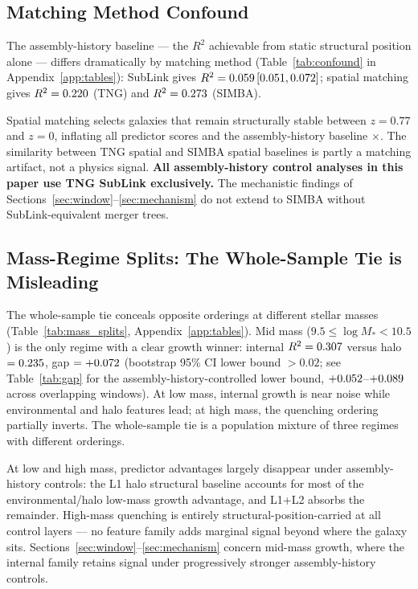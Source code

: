 \documentclass[twocolumn,linenumbers]{aastex701}
\newcommand{\logM}{\log M_*}
\begin{document}
\subsection{Matching Method Confound}
\label{sec:confound}

The assembly-history baseline --- the $R^2$ achievable from static
structural position alone --- differs dramatically by matching method
(Table~\ref{tab:confound} in Appendix~\ref{app:tables}):
SubLink gives $R^2 = 0.059\,[0.051, 0.072]$; spatial matching
gives $R^2 = 0.220$ (TNG) and $R^2 = 0.273$
(SIMBA).

Spatial matching selects galaxies that remain structurally stable between
$z = 0.77$ and $z = 0$, inflating all predictor scores and the
assembly-history baseline \SpatialInflation$\times$.
The similarity between TNG spatial and SIMBA spatial baselines is partly a
matching artifact, not a physics signal.
\textbf{All assembly-history control analyses in this paper use TNG SubLink
exclusively.}
The mechanistic findings of Sections~\ref{sec:window}--\ref{sec:mechanism}
do not extend to SIMBA without SubLink-equivalent merger trees.

\subsection{Mass-Regime Splits: The Whole-Sample Tie is Misleading}
\label{sec:mass_splits}

The whole-sample tie conceals opposite orderings at different stellar masses
(Table~\ref{tab:mass_splits}, Appendix~\ref{app:tables}).
Mid mass ($9.5 \leq \logM < 10.5$) is the only regime with a clear growth
winner: internal $R^2 = 0.307$ versus halo $= 0.235$,
gap $= +0.072$ (bootstrap 95\% CI lower bound $> 0.02$; see
Table~\ref{tab:gap} for the assembly-history-controlled lower bound,
$+0.052$--$+0.089$ across \PairedGapNWindows{} overlapping
windows).
At low mass, internal growth is near noise while environmental and halo
features lead; at high mass, the quenching ordering partially inverts.
The whole-sample tie is a population mixture of three regimes with different
orderings.

At low and high mass, predictor advantages largely disappear under
assembly-history controls: the L1 halo structural baseline accounts for
most of the environmental/halo low-mass growth advantage, and L1+L2 absorbs
the remainder.
High-mass quenching is entirely structural-position-carried at all control
layers --- no feature family adds marginal signal beyond where the galaxy
sits.
Sections~\ref{sec:window}--\ref{sec:mechanism} concern mid-mass growth,
where the internal family retains signal under progressively stronger
assembly-history controls.
\end{document}
